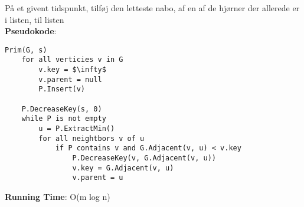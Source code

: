 På et givent tidspunkt, tilføj den letteste nabo, af en af de hjørner der allerede er i listen, til listen\\
\textbf{Pseudokode}:
\begin{lstlisting}[frame=single, mathescape=true]
Prim(G, s)
	for all verticies v in G
		v.key = $\infty$
		v.parent = null
		P.Insert(v)
	
	P.DecreaseKey(s, 0)
	while P is not empty
		u = P.ExtractMin()
		for all neightbors v of u
			if P contains v and G.Adjacent(v, u) < v.key
				P.DecreaseKey(v, G.Adjacent(v, u))
				v.key = G.Adjacent(v, u)
				v.parent = u
\end{lstlisting}
\textbf{Running Time}: O(m log n)

